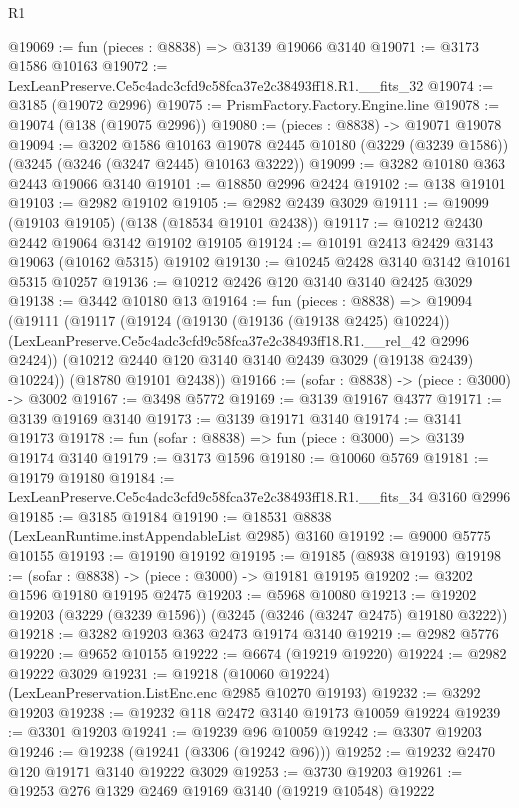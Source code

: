 \begin{lexlean}{R1}
\begin{coremodule}
@19069 := fun (pieces : @8838) => @3139 @19066 @3140
@19071 := @3173 @1586 @10163
@19072 := LexLeanPreserve.Ce5c4adc3cfd9c58fca37e2c38493ff18.R1.__fits_32
@19074 := @3185 (@19072 @2996)
@19075 := PrismFactory.Factory.Engine.line
@19078 := @19074 (@138 (@19075 @2996))
@19080 := (pieces : @8838) -> @19071 @19078
@19094 := @3202
    @1586
    @10163
    @19078
    @2445
    @10180
    (@3229 (@3239 @1586))
    (@3245 (@3246 (@3247 @2445) @10163 @3222))
@19099 := @3282 @10180 @363 @2443 @19066 @3140
@19101 := @18850 @2996 @2424
@19102 := @138 @19101
@19103 := @2982 @19102
@19105 := @2982 @2439 @3029
@19111 := @19099 (@19103 @19105) (@138 (@18534 @19101 @2438))
@19117 := @10212 @2430 @2442 @19064 @3142 @19102 @19105
@19124 := @10191 @2413 @2429 @3143 @19063 (@10162 @5315) @19102
@19130 := @10245 @2428 @3140 @3142 @10161 @5315 @10257
@19136 := @10212 @2426 @120 @3140 @3140 @2425 @3029
@19138 := @3442 @10180 @13
@19164 := fun (pieces : @8838) =>
  @19094
    (@19111
      (@19117
        (@19124
          (@19130 (@19136 (@19138 @2425) @10224))
          (LexLeanPreserve.Ce5c4adc3cfd9c58fca37e2c38493ff18.R1.__rel_42 @2996 @2424))
        (@10212 @2440 @120 @3140 @3140 @2439 @3029 (@19138 @2439) @10224))
      (@18780 @19101 @2438))
@19166 := (sofar : @8838) -> (piece : @3000) -> @3002
@19167 := @3498 @5772
@19169 := @3139 @19167 @4377
@19171 := @3139 @19169 @3140
@19173 := @3139 @19171 @3140
@19174 := @3141 @19173
@19178 := fun (sofar : @8838) => fun (piece : @3000) => @3139 @19174 @3140
@19179 := @3173 @1596
@19180 := @10060 @5769
@19181 := @19179 @19180
@19184 := LexLeanPreserve.Ce5c4adc3cfd9c58fca37e2c38493ff18.R1.__fits_34 @3160 @2996
@19185 := @3185 @19184
@19190 := @18531 @8838 (LexLeanRuntime.instAppendableList @2985) @3160
@19192 := @9000 @5775 @10155
@19193 := @19190 @19192
@19195 := @19185 (@8938 @19193)
@19198 := (sofar : @8838) -> (piece : @3000) -> @19181 @19195
@19202 := @3202 @1596 @19180 @19195 @2475
@19203 := @5968 @10080
@19213 := @19202 @19203 (@3229 (@3239 @1596)) (@3245 (@3246 (@3247 @2475) @19180 @3222))
@19218 := @3282 @19203 @363 @2473 @19174 @3140
@19219 := @2982 @5776
@19220 := @9652 @10155
@19222 := @6674 (@19219 @19220)
@19224 := @2982 @19222 @3029
@19231 := @19218 (@10060 @19224) (LexLeanPreservation.ListEnc.enc @2985 @10270 @19193)
@19232 := @3292 @19203
@19238 := @19232 @118 @2472 @3140 @19173 @10059 @19224
@19239 := @3301 @19203
@19241 := @19239 @96 @10059
@19242 := @3307 @19203
@19246 := @19238 (@19241 (@3306 (@19242 @96)))
@19252 := @19232 @2470 @120 @19171 @3140 @19222 @3029
@19253 := @3730 @19203
@19261 := @19253 @276 @1329 @2469 @19169 @3140 (@19219 @10548) @19222

\end{coremodule}
\end{lexlean}
